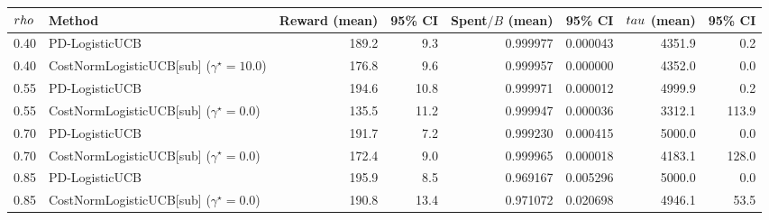 \begin{tabular}{l l r r r r r r}
\toprule
$\\rho$ & Method & Reward (mean) & 95\% CI & Spent$/B$ (mean) & 95\% CI & $\\tau$ (mean) & 95\% CI \\
\midrule
0.40 & PD-LogisticUCB & 189.2 & 9.3 & 0.999977 & 0.000043 & 4351.9 & 0.2 \\
0.40 & CostNormLogisticUCB[sub] ($\gamma^\star=10.0$) & 176.8 & 9.6 & 0.999957 & 0.000000 & 4352.0 & 0.0 \\
0.55 & PD-LogisticUCB & 194.6 & 10.8 & 0.999971 & 0.000012 & 4999.9 & 0.2 \\
0.55 & CostNormLogisticUCB[sub] ($\gamma^\star=0.0$) & 135.5 & 11.2 & 0.999947 & 0.000036 & 3312.1 & 113.9 \\
0.70 & PD-LogisticUCB & 191.7 & 7.2 & 0.999230 & 0.000415 & 5000.0 & 0.0 \\
0.70 & CostNormLogisticUCB[sub] ($\gamma^\star=0.0$) & 172.4 & 9.0 & 0.999965 & 0.000018 & 4183.1 & 128.0 \\
0.85 & PD-LogisticUCB & 195.9 & 8.5 & 0.969167 & 0.005296 & 5000.0 & 0.0 \\
0.85 & CostNormLogisticUCB[sub] ($\gamma^\star=0.0$) & 190.8 & 13.4 & 0.971072 & 0.020698 & 4946.1 & 53.5 \\
\bottomrule
\end{tabular}
